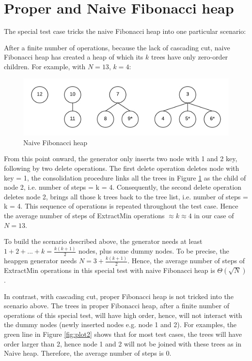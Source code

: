 \documentclass{article}
\begin{document}
\section{Proper and Naive Fibonacci heap}

The special test case tricks the naive Fibonacci heap into one particular scenario:

After a finite number of operations, because the lack of cascading cut, naive Fibonacci heap has created a heap of which its $k$ trees have only zero-order children. For example, with $N=13$, $k=4$:

\begin{figure}[h!]
\centering
\includegraphics[width=\textwidth]{special-naive}
\caption{Naive Fibonacci heap}
\label{fig:naive}
\end{figure}

From this point onward, the generator only inserts two node with 1 and 2 key, following by two delete operations. The first delete operation deletes node with key = 1, the consolidation procedure links all the trees in Figure \ref{fig:naive} as the child of node 2, i.e. number of steps = k = 4. Consequently, the second delete operation deletes node 2, brings all those k trees back to the tree list, i.e. number of steps = k = 4. This sequence of operations is repeated throughout the test case. Hence the average number of steps of ExtractMin operations $\approx k\approx 4$ in our case of $N=13$.

To build the scenario described above, the generator needs at least $1+2+...+k = \frac{k(k+1)}{2}$ nodes, plus some dummy nodes. To be precise, the heapgen generator needs $N=3+\frac{k(k+1)}{2}$. Hence, the average number of steps of ExtractMin operations in this special test with naive Fibonacci heap is $\Theta(\sqrt{N})$.

In contrast, with cascading cut, proper Fibonacci heap is not tricked into the scenario above. The trees in proper Fibonacci heap, after a finite number of operations of this special test, will have high order, hence, will not interact with the dummy nodes (newly inserted nodes e.g. node 1 and 2). For examples, the green line in Figure \ref{fig:plot2} shows that for most test cases, the trees will have order larger than 2, hence node 1 and 2 will not be joined with these trees  as in Naive heap. Therefore, the average number of steps is 0.
\end{document}
